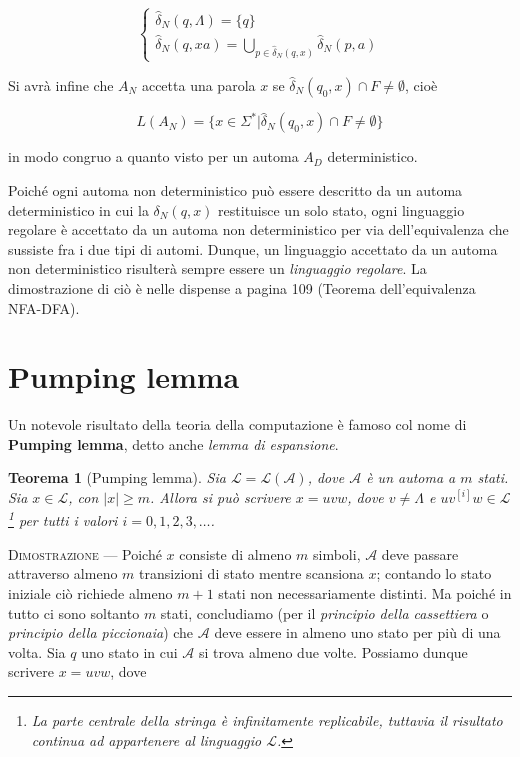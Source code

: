 \documentclass[10pt]{\classname}
\newtheorem{thm}{Teorema}
\theoremstyle{definition}
\theoremstyle{definition}
\begin{document}
$$
\left\{
    \begin{array}{l}
        \hat{\delta}_N (q, \Lambda) = \{q\} \\
        \hat{\delta}_N (q, xa) = \displaystyle \bigcup_{p \in \hat{\delta}_N(q, x)} \hat{\delta}_N (p, a)
    \end{array}
\right.
$$

Si avrà infine che $A_N$ accetta una parola $x$ se $\hat{\delta}_N(q_0, x) \cap F
\neq \emptyset$, cioè

$$L(A_N) = \{x \in \Sigma^* | \hat{\delta}_N(q_0, x) \cap F \neq \emptyset \}$$

in modo congruo a quanto visto per un automa $A_D$ deterministico.

Poiché ogni automa non deterministico può essere descritto da un automa
deterministico in cui la $\delta_N(q, x)$ restituisce un solo stato, ogni
linguaggio regolare è accettato da un automa non deterministico per via
dell'equivalenza che sussiste fra i due tipi di automi. Dunque, un linguaggio
accettato da un automa non deterministico risulterà sempre essere
un \emph{linguaggio regolare}. La dimostrazione di ciò è nelle dispense a
pagina 109 (Teorema dell'equivalenza NFA-DFA).

\section{Pumping lemma}

Un notevole risultato della teoria della computazione è famoso col nome di
\textbf{Pumping lemma}, detto anche \emph{lemma di espansione}.

\begin{thm}[Pumping lemma]
    Sia $\mathcal L = \mathcal L(\mathcal A)$, dove $\mathcal A$ è un automa a
    $m$ stati. Sia $x \in \mathcal L$, con $|x| \geq m$. Allora si può scrivere
    $x = uvw$, dove $v \neq \Lambda$ e $uv^{[i]}w \in \mathcal L$\footnote{La
    parte centrale della stringa è infinitamente replicabile, tuttavia il
risultato continua ad appartenere al linguaggio $\mathcal L$.} per tutti i
    valori $i = 0,1,2,3,\dots$.
\end{thm}

\textsc{Dimostrazione} --- Poiché $x$ consiste di almeno $m$ simboli,
$\mathcal A$ deve passare attraverso almeno $m$ transizioni di stato mentre
scansiona $x$; contando lo stato iniziale ciò richiede almeno $m + 1$ stati non
necessariamente distinti. Ma poiché in tutto ci sono soltanto $m$ stati,
concludiamo (per il \emph{principio della cassettiera} o \emph{principio della piccionaia})
che $\mathcal A$ deve essere in almeno uno stato per più di una volta. Sia $q$ uno
stato in cui $\mathcal A$ si trova almeno due volte. Possiamo dunque scrivere
$x = uvw$, dove 
\end{document}

